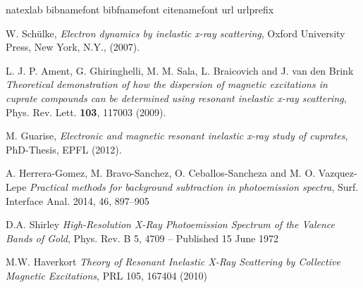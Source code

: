 \documentclass[twoside,twocolumn, elsart]{article}
\begin{document}
\begin{thebibliography}{99} %
\expandafter\ifx\csname natexlab\endcsname\relax\def\natexlab#1{#1}\fi
\expandafter\ifx\csname bibnamefont\endcsname\relax
  \def\bibnamefont#1{#1}\fi
\expandafter\ifx\csname bibfnamefont\endcsname\relax
  \def\bibfnamefont#1{#1}\fi
\expandafter\ifx\csname citenamefont\endcsname\relax
  \def\citenamefont#1{#1}\fi
\expandafter\ifx\csname url\endcsname\relax
  \def\url#1{\texttt{#1}}\fi
\expandafter\ifx\csname urlprefix\endcsname\relax\def\urlprefix{URL }\fi
\providecommand{\bibinfo}[2]{#2}
\providecommand{\eprint}[2][]{\url{#2}}
 
W. Sch\"{u}lke,
\textit{Electron dynamics by inelastic x-ray scattering},
Oxford University Press, New York, N.Y., (2007).

L. J. P. Ament, G. Ghiringhelli, M. M. Sala, L. Braicovich and J. van den Brink
\textit{Theoretical demonstration of how the dispersion of magnetic excitations in cuprate compounds can be determined using resonant inelastic x-ray scattering},
Phys. Rev. Lett. {\bf103}, 117003 (2009).

M. Guarise,
\textit{Electronic and magnetic resonant inelastic x-ray study of cuprates},
PhD-Thesis, EPFL (2012).

A. Herrera-Gomez, M. Bravo-Sanchez, O. Ceballos-Sancheza and M. O. Vazquez-Lepe
\textit{Practical methods for background subtraction in photoemission spectra},
Surf. Interface Anal. 2014, 46, 897–905

D.A. Shirley
\textit{High-Resolution X-Ray Photoemission Spectrum of the Valence Bands of Gold},
Phys. Rev. B 5, 4709 – Published 15 June 1972

M.W. Haverkort
\textit{Theory of Resonant Inelastic X-Ray Scattering by Collective Magnetic Excitations},
PRL 105, 167404 (2010)

\end{thebibliography}

\end{document}
